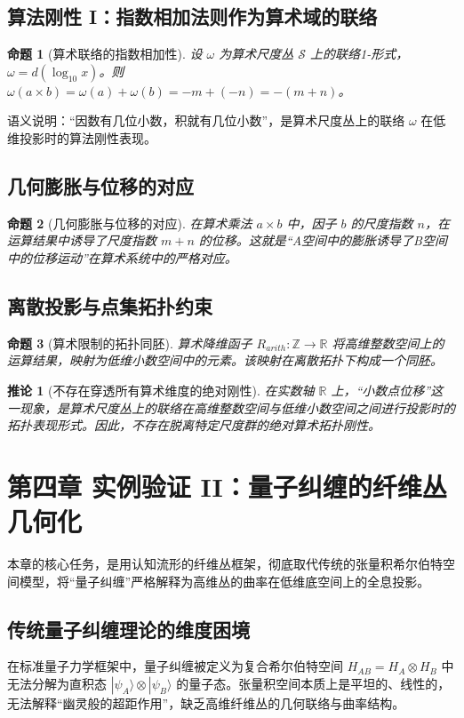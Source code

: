 \documentclass[11pt,a4paper]{article}
\newtheorem{proposition}{命题}
\newtheorem{corollary}{推论}
\begin{document}
\subsection{算法刚性 I：指数相加法则作为算术域的联络}
\begin{proposition}[算术联络的指数相加性]
设 \(\omega\) 为算术尺度丛 \(\mathcal S\) 上的联络1-形式，\(\omega=d(\log_{10} x)\)。则 \(\omega(a\times b)=\omega(a)+\omega(b)=-m+(-n)=-(m+n)\)。
\end{proposition}
语义说明：“因数有几位小数，积就有几位小数”，是算术尺度丛上的联络 \(\omega\) 在低维投影时的算法刚性表现。

\subsection{几何膨胀与位移的对应}
\begin{proposition}[几何膨胀与位移的对应]
在算术乘法 \(a\times b\) 中，因子 \(b\) 的尺度指数 \(n\)，在运算结果中诱导了尺度指数 \(m+n\) 的位移。这就是“A空间中的膨胀诱导了B空间中的位移运动”在算术系统中的严格对应。
\end{proposition}

\subsection{离散投影与点集拓扑约束}
\begin{proposition}[算术限制的拓扑同胚]
算术降维函子 \(R_{arith}:\mathbb Z\to\mathbb R\) 将高维整数空间上的运算结果，映射为低维小数空间中的元素。该映射在离散拓扑下构成一个同胚。
\end{proposition}

\begin{corollary}[不存在穿透所有算术维度的绝对刚性]
在实数轴 \(\mathbb R\) 上，“小数点位移”这一现象，是算术尺度丛上的联络在高维整数空间与低维小数空间之间进行投影时的拓扑表现形式。因此，不存在脱离特定尺度群的绝对算术拓扑刚性。
\end{corollary}

\clearpage
\section{第四章 实例验证 II：量子纠缠的纤维丛几何化}
本章的核心任务，是用认知流形的纤维丛框架，彻底取代传统的张量积希尔伯特空间模型，将“量子纠缠”严格解释为高维丛的曲率在低维底空间上的全息投影。

\subsection{传统量子纠缠理论的维度困境}
在标准量子力学框架中，量子纠缠被定义为复合希尔伯特空间 \(H_{AB}=H_A\otimes H_B\) 中无法分解为直积态 \(|\psi_A\rangle\otimes|\psi_B\rangle\) 的量子态。张量积空间本质上是平坦的、线性的，无法解释“幽灵般的超距作用”，缺乏高维纤维丛的几何联络与曲率结构。
\end{document}
